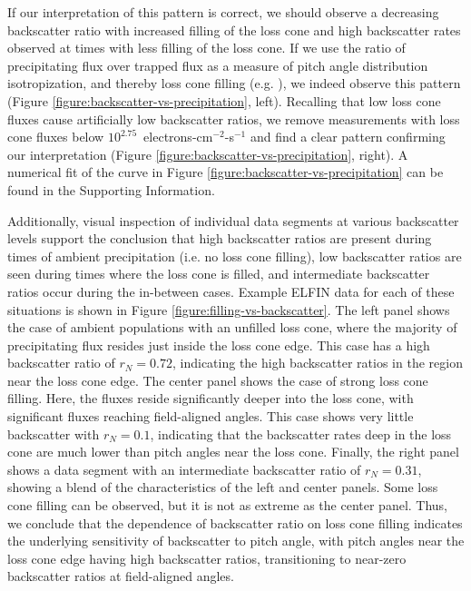 \documentclass[draft]{agujournal2019}
\begin{document}
If our interpretation of this pattern is correct, we should observe a decreasing backscatter ratio with increased filling of the loss cone and high backscatter rates observed at times with less filling of the loss cone. If we use the ratio of precipitating flux over trapped flux as a measure of pitch angle distribution isotropization, and thereby loss cone filling (e.g. ), we indeed observe this pattern (Figure \ref{figure:backscatter-vs-precipitation}, left). Recalling that low loss cone fluxes cause artificially low backscatter ratios, we remove measurements with loss cone fluxes below $10^{2.75}$~electrons-cm$^{-2}$-s$^{-1}$ and find a clear pattern confirming our interpretation (Figure \ref{figure:backscatter-vs-precipitation}, right). A numerical fit of the curve in Figure \ref{figure:backscatter-vs-precipitation} can be found in the Supporting Information.

Additionally, visual inspection of individual data segments at various backscatter levels support the conclusion that high backscatter ratios are present during times of ambient precipitation (i.e. no loss cone filling), low backscatter ratios are seen during times where the loss cone is filled, and intermediate backscatter ratios occur during the in-between cases. Example ELFIN data for each of these situations is shown in Figure \ref{figure:filling-vs-backscatter}. The left panel shows the case of ambient populations with an unfilled loss cone, where the majority of precipitating flux resides just inside the loss cone edge. This case has a high backscatter ratio of $r_N = 0.72$, indicating the high backscatter ratios in the region near the loss cone edge. The center panel shows the case of strong loss cone filling. Here, the fluxes reside significantly deeper into the loss cone, with significant fluxes reaching field-aligned angles. This case shows very little backscatter with $r_N = 0.1$, indicating that the backscatter rates deep in the loss cone are much lower than pitch angles near the loss cone. Finally, the right panel shows a data segment with an intermediate backscatter ratio of $r_N = 0.31$, showing a blend of the characteristics of the left and center panels. Some loss cone filling can be observed, but it is not as extreme as the center panel. Thus, we conclude that the dependence of backscatter ratio on loss cone filling indicates the underlying sensitivity of backscatter to pitch angle, with pitch angles near the loss cone edge having high backscatter ratios, transitioning to near-zero backscatter ratios at field-aligned angles.
\end{document}
